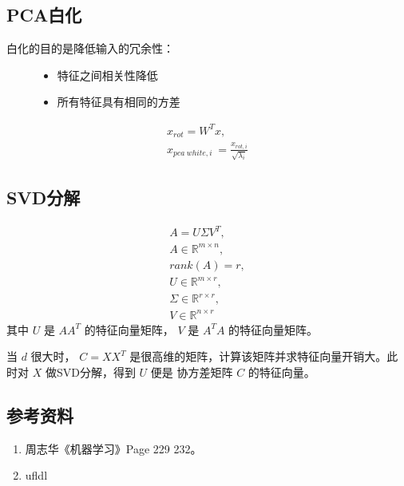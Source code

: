 \documentclass[letterpaper,10pt,english]{sphinxmanual}
\begin{document}
\subsection{PCA白化}
\label{\detokenize{machineLearning/03_pca:pca}}\begin{description}
\item[{白化的目的是降低输入的冗余性：}] \leavevmode\begin{itemize}
\item {} 
特征之间相关性降低

\item {} 
所有特征具有相同的方差

\end{itemize}

\end{description}
\begin{equation*}
\begin{split}x_{rot} = W^T x, \\
x_{pca\ white, i} \ = \frac{x_{rot, i}}{\sqrt{\lambda_i}}\end{split}
\end{equation*}

\subsection{SVD分解}
\label{\detokenize{machineLearning/03_pca:svd}}\begin{equation*}
\begin{split}A = U \Sigma V^T,\\
A \in \mathbb{R}^{m \times n}, \\
rank(A) = r,\\
U \in \mathbb{R}^{m \times r}, \\
\Sigma \in \mathbb{R}^{r \times r}, \\
V \in \mathbb{R}^{n \times r}\end{split}
\end{equation*}
其中 \(U\) 是 \(AA^T\) 的特征向量矩阵， \(V\) 是 \(A^TA\) 的特征向量矩阵。

当 \(d\) 很大时， \(C=XX^T\) 是很高维的矩阵，计算该矩阵并求特征向量开销大。此时对 \(X\) 做SVD分解，得到 \(U\) 便是
协方差矩阵 \(C\) 的特征向量。


\subsection{参考资料}
\label{\detokenize{machineLearning/03_pca:id4}}\begin{enumerate}
\item {} 
周志华《机器学习》Page 229 \textendash{} 232。

\item {} 
ufldl

\end{enumerate}
\begin{quote}

\end{quote}
\end{document}
